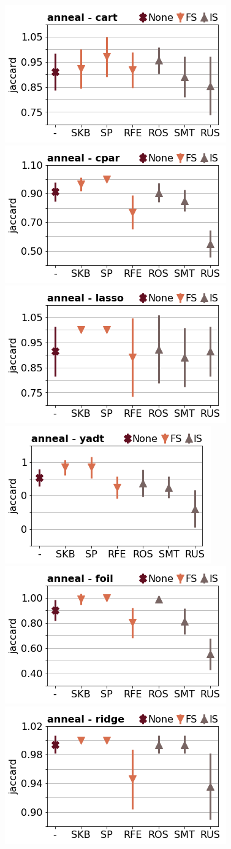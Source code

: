 \documentclass[runningheads,a4paper]{llncs}
\begin{document}
\begin{figure}[!h]
\includegraphics[width=0.32\linewidth]{fig/preps_anneal_DT_sklearn_jaccard.png}
\includegraphics[width=0.32\linewidth]{fig/preps_anneal_RB_cpar_jaccard.png}
\includegraphics[width=0.32\linewidth]{fig/preps_anneal_LM_lasso_jaccard.png}
\includegraphics[width=0.32\linewidth]{fig/preps_anneal_DT_yadt_jaccard.png}
\includegraphics[width=0.32\linewidth]{fig/preps_anneal_RB_foil_jaccard.png}
\includegraphics[width=0.32\linewidth]{fig/preps_anneal_LM_ridge_jaccard.png}
\end{figure}
\end{document}
